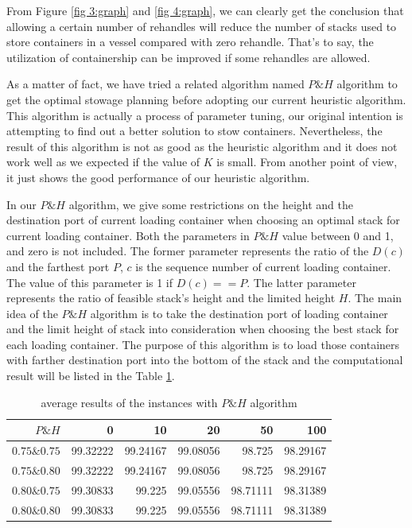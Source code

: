 \documentclass[review,3p,times,authoryear,12pt]{elsarticle}
\begin{document}
From Figure \ref{fig 3:graph} and \ref{fig 4:graph}, we can clearly get the conclusion that allowing a certain number of rehandles will reduce the number of stacks used to store containers in a vessel compared with zero rehandle.
That's to say, the utilization of containership can be improved if some rehandles are allowed.

As a matter of fact, we have tried a related algorithm named $P\&H$ algorithm to get the optimal stowage planning before adopting our current heuristic algorithm.
This algorithm is actually a process of parameter tuning, our original intention is attempting to find out a better solution to stow containers.
Nevertheless, the result of this algorithm is not as good as the heuristic algorithm and it does not work well as we expected if the value of $K$ is small.
From another point of view, it just shows the good performance of our heuristic algorithm.

In our $P\&H$ algorithm, we give some restrictions on the height and the destination port of current loading container when choosing an  optimal stack for current loading container.
Both the parameters in $P\&H$ value between 0 and 1, and zero is not included.
The former parameter represents the ratio of the $D(c)$ and the farthest port $P$, $c$ is the sequence number of current loading container.
The value of this parameter is 1 if $D(c)==P$.
The latter parameter represents the ratio of feasible stack's height and the limited height $H$.
The main idea of the $P\&H$ algorithm is to take the destination port of loading container and the limit height of stack into consideration when choosing the best stack for each loading container.
The purpose of this algorithm is to load those containers with farther destination port into the bottom of the stack and the computational result will be listed in the Table \ref{tab:5}.

\begin{table}[htbp]
  \centering
  \setlength{\belowcaptionskip}{10pt}
  \caption{average results of the instances with $P\&H$ algorithm}
    \begin{tabular}{r|r|r|r|r|r}
    \hline
     $P\&H$       &0   &10  &20  &50  &100\\
    \hline
    $0.75\&0.75$   &99.32222  &99.24167  &99.08056   &98.725  &98.29167\\
    \hline
    $0.75\&0.80$   &99.32222  &99.24167  &99.08056   &98.725  &98.29167\\
    \hline
    $0.80\&0.75$   &99.30833  &99.225  &99.05556   &98.71111  &98.31389\\
    \hline
    $0.80\&0.80$    &99.30833  &99.225  &99.05556   &98.71111  &98.31389\\
    \hline
    \end{tabular}
  \label{tab:5}
\end{table}
\end{document}
